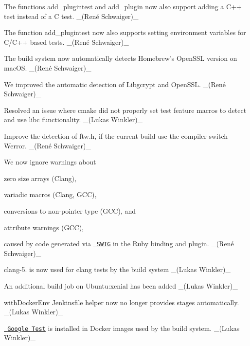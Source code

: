 \begin{DoxyItemize}
\item The functions {\ttfamily add\+\_\+plugintest} and {\ttfamily add\+\_\+plugin} now also support adding a C++ test instead of a C test. \+\_\+(René Schwaiger)\+\_\+
\item The function {\ttfamily add\+\_\+plugintest} now also supports setting environment variables for C/\+C++ based tests. \+\_\+(René Schwaiger)\+\_\+
\item The build system now automatically detects Homebrew’s Open\+S\+SL version on mac\+OS. \+\_\+(René Schwaiger)\+\_\+
\item We improved the automatic detection of Libgcrypt and Open\+S\+SL. \+\_\+(René Schwaiger)\+\_\+
\item Resolved an issue where cmake did not properly set test feature macros to detect and use libc functionality. \+\_\+(\+Lukas Winkler)\+\_\+
\item Improve the detection of {\ttfamily ftw.\+h}, if the current build use the compiler switch {\ttfamily -\/Werror}. \+\_\+(René Schwaiger)\+\_\+
\item We now ignore warnings about
\begin{DoxyItemize}
\item zero size arrays (Clang),
\item variadic macros (Clang, G\+CC),
\item conversions to non-\/pointer type (G\+CC), and
\item attribute warnings (G\+CC),
\end{DoxyItemize}

caused by code generated via \href{http://www.swig.org}{\texttt{ S\+W\+IG}} in the Ruby binding and plugin. \+\_\+(René Schwaiger)\+\_\+
\end{DoxyItemize}


\begin{DoxyItemize}
\item {\ttfamily clang-\/5.} is now used for clang tests by the build system \+\_\+(\+Lukas Winkler)\+\_\+
\item An additional build job on Ubuntu\+:xenial has been added \+\_\+(\+Lukas Winkler)\+\_\+
\item {\ttfamily with\+Docker\+Env} Jenkinsfile helper now no longer provides stages automatically. \+\_\+(\+Lukas Winkler)\+\_\+
\item \href{https://github.com/google/googletest}{\texttt{ Google Test}} is installed in Docker images used by the build system. \+\_\+(\+Lukas Winkler)\+\_\+
\end{DoxyItemize}


